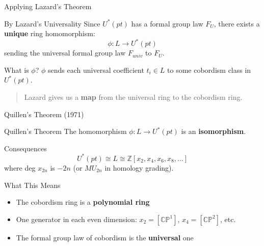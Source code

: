 \documentclass{beamer}
\begin{document}
\begin{frame}{Applying Lazard's Theorem}
  \begin{block}{By Lazard's Universality}
    Since $U^*(pt)$ has a formal group law $F_U$, there exists a \textbf{unique} ring homomorphism:
    \[
      \phi: L \longrightarrow U^*(pt)
    \]
    sending the universal formal group law $F_{univ}$ to $F_U$.
  \end{block}
  \begin{center}
  \end{center}
  \begin{block}{What is $\phi$?}
    $\phi$ sends each universal coefficient $t_i \in L$ to some cobordism class in $U^*(pt)$.
  \end{block}
  \begin{quote}
    \small Lazard gives us a \textbf{map} from the universal ring to the cobordism ring.
  \end{quote}
\end{frame}

\begin{frame}{Quillen's Theorem (1971)}
  \begin{alertblock}{Quillen's Theorem}
    The homomorphism $\phi: L \to U^*(pt)$ is an \textbf{isomorphism}.
  \end{alertblock}
  \begin{block}{Consequences}
    \[
      U^*(pt) \cong L \cong \mathbb{Z}[x_2, x_4, x_6, x_8, \dots]
    \]
    where deg $x_{2n}$ is $-2n$ (or $MU_{2n}$ in homology grading).
  \end{block}
  \begin{block}{What This Means}
  \begin{itemize}
    \item The cobordism ring is a \textbf{polynomial ring}
    \item One generator in each even dimension: $x_2 = [\mathbb{CP}^1]$, $x_4 = [\mathbb{CP}^2]$, etc.
    \item The formal group law of cobordism is the \textbf{universal} one
  \end{itemize}
  \end{block}
\end{frame}
\end{document}
